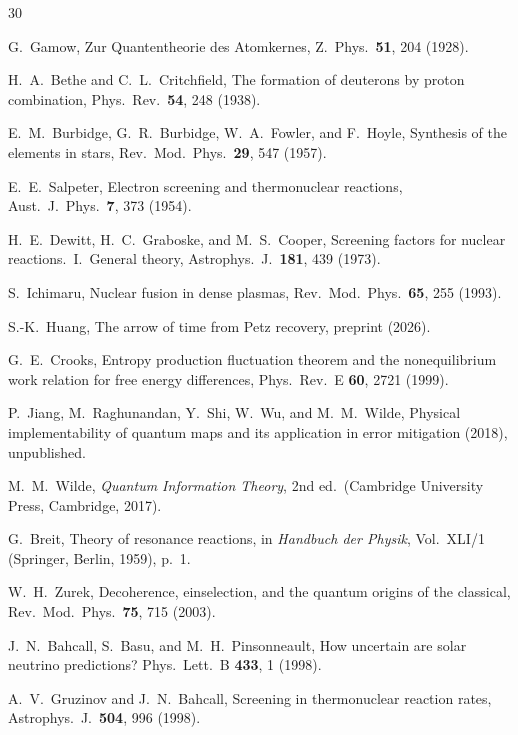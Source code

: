 \documentclass[prc,twocolumn,superscriptaddress,longbibliography,floatfix]{revtex4-2}
\begin{document}
\begin{thebibliography}{30}

G.~Gamow,
Zur Quantentheorie des Atomkernes,
Z.\ Phys.\ \textbf{51}, 204 (1928).

H.~A.~Bethe and C.~L.~Critchfield,
The formation of deuterons by proton combination,
Phys.\ Rev.\ \textbf{54}, 248 (1938).

E.~M.~Burbidge, G.~R.~Burbidge, W.~A.~Fowler, and F.~Hoyle,
Synthesis of the elements in stars,
Rev.\ Mod.\ Phys.\ \textbf{29}, 547 (1957).

E.~E.~Salpeter,
Electron screening and thermonuclear reactions,
Aust.\ J.\ Phys.\ \textbf{7}, 373 (1954).

H.~E.~Dewitt, H.~C.~Graboske, and M.~S.~Cooper,
Screening factors for nuclear reactions.\ I.\ General theory,
Astrophys.\ J.\ \textbf{181}, 439 (1973).

S.~Ichimaru,
Nuclear fusion in dense plasmas,
Rev.\ Mod.\ Phys.\ \textbf{65}, 255 (1993).

S.-K.~Huang,
The arrow of time from Petz recovery,
preprint (2026).

G.~E.~Crooks,
Entropy production fluctuation theorem and the nonequilibrium work
relation for free energy differences,
Phys.\ Rev.\ E \textbf{60}, 2721 (1999).

P.~Jiang, M.~Raghunandan, Y.~Shi, W.~Wu, and M.~M.~Wilde,
Physical implementability of quantum maps and its application in
error mitigation (2018),
unpublished.

M.~M.~Wilde,
\textit{Quantum Information Theory}, 2nd ed.\
(Cambridge University Press, Cambridge, 2017).

G.~Breit,
Theory of resonance reactions,
in \textit{Handbuch der Physik}, Vol.\ XLI/1
(Springer, Berlin, 1959), p.\ 1.

W.~H.~Zurek,
Decoherence, einselection, and the quantum origins of the classical,
Rev.\ Mod.\ Phys.\ \textbf{75}, 715 (2003).

J.~N.~Bahcall, S.~Basu, and M.~H.~Pinsonneault,
How uncertain are solar neutrino predictions?
Phys.\ Lett.\ B \textbf{433}, 1 (1998).

A.~V.~Gruzinov and J.~N.~Bahcall,
Screening in thermonuclear reaction rates,
Astrophys.\ J.\ \textbf{504}, 996 (1998).


\end{thebibliography}
\end{document}
